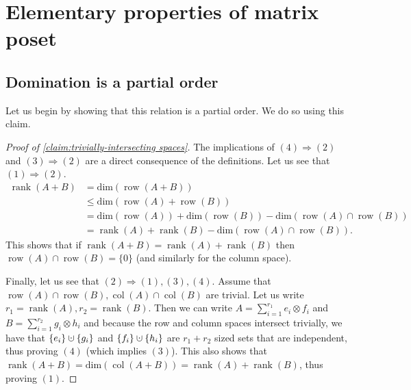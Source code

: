 \documentclass[10pt,a4paper]{article}
\newcommand{\prettyref}[1]{\cref{#1}}
\theoremstyle{definition}
\theoremstyle{remark}
\newcommand{\set}[1]{\{#1\}}
\newcommand{\iprod}[1]{\langle#1\rangle}
\def\dim{\mathrm{ dim}}
\def\sp{\mathrm{ span}}
\DeclareMathOperator{\rank}{rank}
\DeclareMathOperator{\row}{row}
\DeclareMathOperator{\col}{col}
\renewcommand{\leq}{\leqslant}
\numberwithin{equation}{section}
\newcommand{\dunion}{\mathbin{\mathaccent\cdot\cup}}
\let\pref=\prettyref
\begin{document}
\section{Elementary properties of matrix poset} \label{app:removing-lower-matrix}
\subsection{Domination is a partial order}
Let us begin by showing that this relation is a partial order. We do so using this claim.

\begin{proof}[Proof of \pref{claim:trivially-intersecting spaces}]
    The implications of \((4) \Rightarrow (2)\) and \((3) \Rightarrow (2)\) are a direct consequence of the definitions. Let us see that \((1) \Rightarrow (2)\).
    \begin{align*}
        \rank(A+B) &= \dim(\row(A+B)) \\
        &\leq \dim(\row(A) + \row(B))\\ 
        &= \dim(\row(A)) + \dim(\row(B)) - \dim(\row(A) \cap \row(B)) \\
        &= \rank(A) + \rank(B) - \dim(\row(A) \cap \row(B)).
    \end{align*}
    This shows that if \(\rank(A+B) = \rank(A) + \rank(B)\) then \(\row(A) \cap \row(B) = \set{0}\) (and similarly for the column space).

    Finally, let us see that \((2) \Rightarrow (1),(3),(4)\). Assume that \(\row(A) \cap \row(B), \col(A) \cap \col(B)\) are trivial. Let us write \(r_1 = \rank(A), r_2 = \rank(B)\). Then we can write \(A = \sum_{i=1}^{r_1} e_i \otimes f_i\) and \(B = \sum_{i=1}^{r_2} g_i \otimes h_i\) and because the row and column spaces intersect trivially, we have that \(\set{e_i} \dunion \set{g_i}\) and \(\set{f_i} \dunion \set{h_i}\) are \(r_1 + r_2\) sized sets that are independent, thus proving \((4)\) (which implies \((3)\)). This also shows that \(\rank(A+B) = \dim(\col(A+B)) = \rank(A)+\rank(B)\), thus proving \((1)\).
    
\end{proof}
\end{document}

